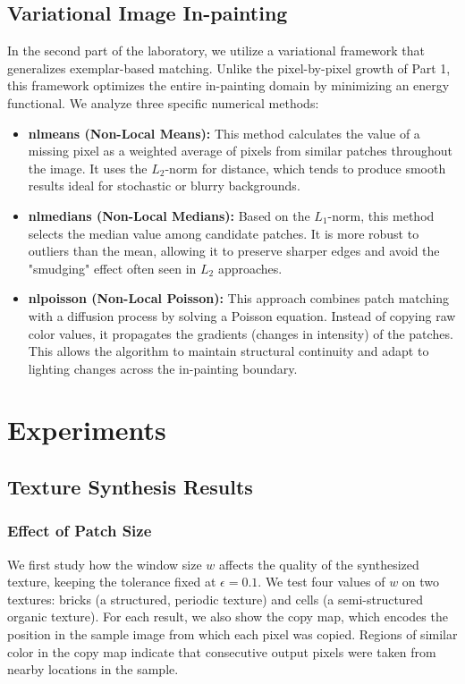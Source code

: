 \documentclass{article}
\begin{document}
\subsection{Variational Image In-painting}
In the second part of the laboratory, we utilize a variational framework that generalizes exemplar-based matching. Unlike the pixel-by-pixel growth of Part 1, this framework optimizes the entire in-painting domain by minimizing an energy functional. We analyze three specific numerical methods:

\begin{itemize}
    \item \textbf{nlmeans (Non-Local Means):} This method calculates the value of a missing pixel as a weighted average of pixels from similar patches throughout the image. It uses the $L_2$-norm for distance, which tends to produce smooth results ideal for stochastic or blurry backgrounds.
    \item \textbf{nlmedians (Non-Local Medians):} Based on the $L_1$-norm, this method selects the median value among candidate patches. It is more robust to outliers than the mean, allowing it to preserve sharper edges and avoid the "smudging" effect often seen in $L_2$ approaches.
    \item \textbf{nlpoisson (Non-Local Poisson):} This approach combines patch matching with a diffusion process by solving a Poisson equation. Instead of copying raw color values, it propagates the gradients (changes in intensity) of the patches. This allows the algorithm to maintain structural continuity and adapt to lighting changes across the in-painting boundary.
\end{itemize}

\section{Experiments}
\label{sec:Experiments}

\subsection{Texture Synthesis Results}

\subsubsection{Effect of Patch Size}

We first study how the window size $w$ affects the quality of the synthesized texture, keeping the tolerance fixed at $\epsilon = 0.1$. We test four values of $w$ on two textures: bricks (a structured, periodic texture) and cells (a semi-structured organic texture). For each result, we also show the copy map, which encodes the position in the sample image from which each pixel was copied. Regions of similar color in the copy map indicate that consecutive output pixels were taken from nearby locations in the sample.
\end{document}
